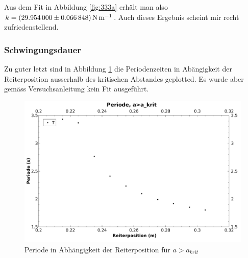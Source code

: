 Aus dem Fit in Abbildung \ref{fig:333a} erh\"alt man also
$k = \SI[separate-uncertainty  =  true]{29.954 \pm  0.066848}{\newton\per\meter}$.
Auch dieses Ergebnis scheint mir recht zufriedenstellend.


\clearpage
\subsubsection{Schwingungsdauer}
\label{subsubsec:schwingungsdauer}

Zu  guter  letzt  sind  in  Abbildung  \ref{fig:333b}  die  Periodenzeiten  in
Ab\"angigkeit   der  Reiterposition   ausserhalb   des  kritischen   Abstandes
geplotted. Es wurde aber gem\"ass Versuchsanleitung kein Fit ausgef\"uhrt.

\begin{figure}[h!]
    \centering
    \includegraphics[width=\textwidth]{images/333b.pdf}
    \caption{%
        Periode in Abh\"angigkeit der Reiterposition f\"ur $a>a_{krit}$
    }
    \label{fig:333b}
\end{figure}
